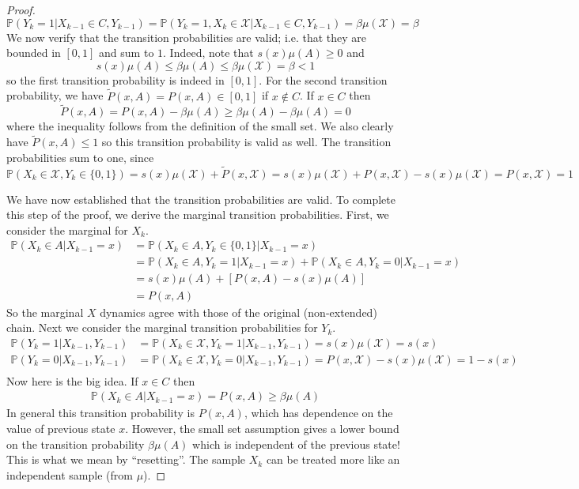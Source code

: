 \documentclass[12pt]{article}
\newcommand{\Prob}{\mathbb{P}}
\begin{document}
\begin{proof}
\[\Prob(Y_k = 1|X_{k-1} \in C, Y_{k-1}) = \Prob(Y_k = 1, X_k \in \mathcal{X}|X_{k-1} \in C, Y_{k-1}) = \beta \mu(\mathcal{X}) = \beta\]
We now verify that the transition probabilities are valid; i.e. that they are bounded in $[0, 1]$ and sum to $1$. Indeed, note that $s(x) \mu(A) \geq 0$ and 
\[s(x) \mu(A) \leq \beta \mu(A) \leq \beta \mu(\mathcal{X}) = \beta < 1\]
so the first transition probability is indeed in $[0, 1]$. For the second transition probability, we have $\tilde{P}(x, A) = P(x, A) \in [0, 1]$ if $x \notin C$. If $x \in C$ then 
\[\tilde{P}(x, A) = P(x, A) - \beta \mu(A) \geq \beta \mu(A) - \beta \mu(A) = 0\]
where the inequality follows from the definition of the small set. We also clearly have $\tilde{P}(x, A) \leq 1$ so this transition probability is valid as well. The transition probabilities sum to one, 
since 
\[\Prob(X_k \in \mathcal{X}, Y_k \in \{0, 1\}) = s(x)\mu(\mathcal{X}) + \tilde{P}(x, \mathcal{X}) = s(x)\mu(\mathcal{X}) + P(x, \mathcal{X}) - s(x)\mu(\mathcal{X}) =  P(x, \mathcal{X}) = 1\]

We have now established that the transition probabilities are valid. To complete this step of the proof, we derive the marginal transition probabilities. First, we consider the marginal for 
$X_k$. 
\begin{align*}
\Prob(X_k \in A|X_{k - 1} = x) &= \Prob(X_k \in A, Y_k \in \{0, 1\}| X_{k - 1} = x) \\
					     &= \Prob(X_k \in A, Y_k = 1| X_{k - 1} = x) + \Prob(X_k \in A, Y_k = 0| X_{k - 1} = x) \\
					     &= s(x)\mu(A) + \left[P(x, A) - s(x)\mu(A) \right] \\
					     &= P(x, A)
\end{align*}
So the marginal $X$ dynamics agree with those of the original (non-extended) chain. Next we consider the marginal transition probabilities for $Y_k$.
\begin{align*}
\Prob(Y_k = 1|X_{k-1}, Y_{k-1}) &= \Prob(X_k \in \mathcal{X}, Y_k = 1|X_{k-1}, Y_{k-1}) = s(x)\mu(\mathcal{X}) = s(x) \\
\Prob(Y_k = 0|X_{k-1}, Y_{k-1}) &= \Prob(X_k \in \mathcal{X}, Y_k = 0|X_{k-1}, Y_{k-1}) = P(x, \mathcal{X}) - s(x)\mu(\mathcal{X}) = 1- s(x) \\
\end{align*}
Now here is the big idea. If $x \in C$ then 
\begin{align*}
\Prob(X_k \in A|X_{k-1} = x) = P(x, A) \geq \beta \mu(A)
\end{align*}
In general this transition probability is $P(x, A)$, which has dependence on the value of previous state $x$. However, the small set assumption gives a lower bound on the transition 
probability $\beta \mu(A)$ which is independent of the previous state! This is what we mean by ``resetting''. The sample $X_k$ can be treated more like an independent sample (from $\mu$). 




\end{proof} 
\end{document}
